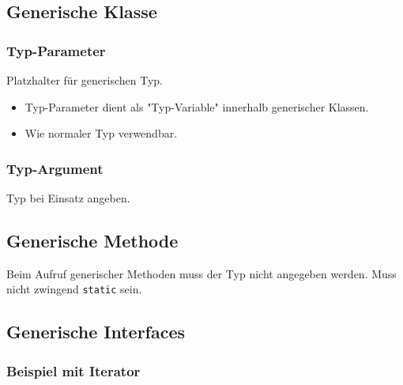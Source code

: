 \begin{minipage}[t]{0.51\columnwidth}
    \subsection{Generische Klasse}
    \subsubsection{Typ-Parameter}
    \raggedright%
    Platzhalter für generischen Typ.
    
    \begin{itemize}
        \item Typ-Parameter dient als "Typ-Variable" innerhalb generischer Klassen.
        \item Wie normaler Typ verwendbar.
    \end{itemize}
    \vspace{-0.8\abovedisplayskip}
    \subsubsection{Typ-Argument}
    Typ bei Einsatz angeben.
    
\end{minipage}\hfill%
\begin{minipage}[t]{0.48\columnwidth}
    \subsection{Generische Methode}
    
    \raggedright%
    Beim Aufruf generischer Methoden muss der Typ nicht angegeben werden.
    Muss nicht zwingend \lstinline|static| sein.
    \vspace{0.8pt}
    \subsection{Generische Interfaces}
    \subsubsection{Beispiel mit Iterator}
    
    
\end{minipage}


